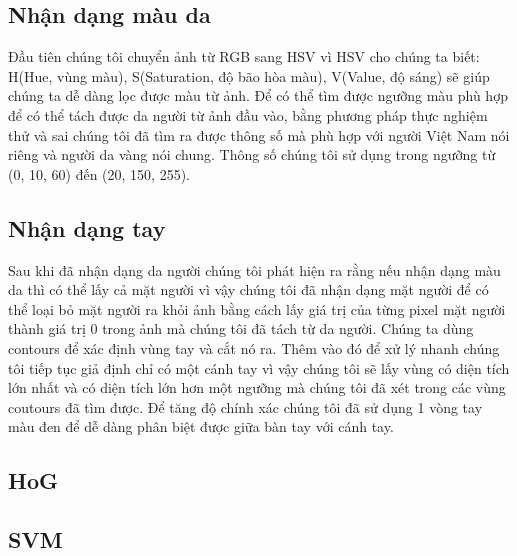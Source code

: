 \documentclass[a4paper, 12pt]{article}
\begin{document}
\subsection{Nhận dạng màu da}
Đầu tiên chúng tôi chuyển ảnh từ RGB sang HSV vì HSV cho chúng ta biết: H(Hue, vùng màu), S(Saturation, độ bão hòa màu), V(Value, độ sáng) sẽ giúp chúng ta dễ dàng lọc được màu từ ảnh. Để có thể tìm được ngưỡng màu phù hợp để có thể tách được da người từ ảnh đầu vào, bằng phương pháp thực nghiệm thử và sai chúng tôi đã tìm ra được thông số mà phù hợp với người Việt Nam nói riêng và người da vàng nói chung. Thông số chúng tôi sử dụng trong ngưỡng từ (0, 10, 60) đến (20, 150, 255).
\subsection{Nhận dạng tay}
Sau khi đã nhận dạng da người chúng tôi phát hiện ra rằng nếu nhận dạng màu da thì có thể lấy cả mặt người vì vậy chúng tôi đã nhận dạng mặt người để có thể loại bỏ mặt người ra khỏi ảnh bằng cách lấy giá trị của từng pixel mặt người thành giá trị 0 trong ảnh mà chúng tôi đã tách từ da người. Chúng ta dùng contours để xác định vùng tay và cắt nó ra. Thêm vào đó để xử lý nhanh chúng tôi tiếp tục giả định chỉ có một cánh tay vì vậy chúng tôi sẽ lấy vùng có diện tích lớn nhất và có diện tích lớn hơn một ngưỡng mà chúng tôi đã xét trong các vùng coutours đã tìm được. Để tăng độ chính xác chúng tôi đã sử dụng 1 vòng tay màu đen để dễ dàng phân biệt được giữa bàn tay với cánh tay.
\subsection{HoG}

\subsection{SVM}

\begin{thebibliography}{}

\end{thebibliography}
\end{document}
